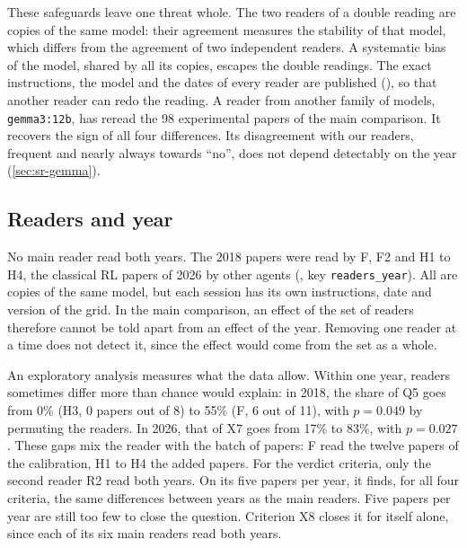 These safeguards leave one threat whole. The two readers of a double reading are copies of the same
model: their agreement measures the stability of that model, which differs from the agreement of two
independent readers. A systematic bias of the model, shared by all its copies, escapes the double
readings. The exact instructions, the model and the dates of every reader are published
(), so that another reader can redo the reading. A reader from another family
of models, \texttt{gemma3:12b}, has reread the 98 experimental papers of the main comparison.
It recovers the sign of all four differences. Its disagreement with our
readers, frequent and nearly always towards \enquote{no}, does not depend detectably on the year
(\cref{sec:sr-gemma}).

\subsection{Readers and year}

No main reader read both years. The 2018 papers were read by F, F2 and H1 to H4, the classical RL
papers of 2026 by other agents (, key \texttt{readers\_year}). All are
copies of the same model, but each session has its own instructions, date and version of the grid.
In the main comparison, an effect of the set of readers therefore cannot be told apart from an effect
of the year. Removing one reader at a time does not detect it, since the effect would
come from the set as a whole.

An exploratory analysis measures what the data allow. Within one year, readers sometimes differ more than
chance would explain: in 2018, the share of Q5 goes from 0\% (H3, 0 papers out of 8) to 55\% (F, 6
out of 11), with $p = 0.049$ by permuting the readers. In 2026, that of X7 goes from 17\% to 83\%,
with $p = 0.027$. These gaps mix the reader with the batch of papers: F read the twelve papers of the
calibration, H1 to H4 the added papers. For the verdict criteria, only the second reader R2 read both
years. On its five papers per year, it finds, for all four criteria, the same differences between
years as the main readers. Five papers per year are still too few to close the question. Criterion
X8 closes it for itself alone, since each of its six main readers read both years.

